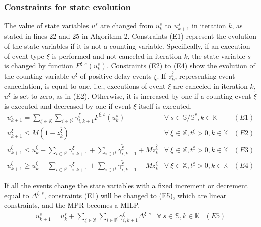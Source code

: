 \documentclass[]{interact}
\theoremstyle{plain}%
\theoremstyle{definition}
\theoremstyle{remark}
\begin{document}
\subsubsection{Constraints for state evolution}\label{sec:const_E}
The value of state variables $u^{s}$ are changed from $u^{s}_{k}$ to $u^{s}_{k+1}$ in iteration $k$, as stated in lines 22 and 25 in Algorithm 2. Constraints (E1) represent the evolution of the state variables if it is not a counting variable. Specifically, if an execution of event type $\xi$ is performed and not canceled in iteration $k$, the state variable $s$ is changed by function $F^{\xi,s}(u^{s}_{k})$. Constraints (E2) to (E4) show the evolution of the counting variable $u^{\xi}$ of positive-delay events ${\xi}$. If $z^{\bar{\xi}}_{k}$, representing event cancellation, is equal to one, i.e., executions of event ${\xi}$ are canceled in iteration $k$, $u^{\xi}$ is set to zero, as in (E2). Otherwise, it is increased by one if a counting event ${\tilde{\xi}}$ is executed and decreased by one if event ${\xi}$ itself is executed.
\begin{eqnarray}
u^{s}_{k+1} =  \sum_{\xi\in \mathbb{X}} \sum_{i\in \mathbb{I}^{\xi}} \gamma^{\xi}_{i,k+1} F^{\xi,s}(u^s_{k})& \forall\ s\in \mathbb{S}/\mathbb{S}^c,k\in \mathbb{K}&(E1)\nonumber\\
u^{\xi}_{k+1}\le M(1-z^{\bar{\xi}}_{k}) & \forall\ \xi\in\mathbb{X},t^{\xi}>0,k\in \mathbb{K}&(E2)\nonumber\\
u^{\xi}_{k+1}\le u^{\xi}_{k} - \sum_{i\in \mathbb{I}^{\xi}} \gamma^{\xi}_{i,k+1} + \sum_{i\in \mathbb{I}^{\xi}} \gamma^{\tilde{\xi}}_{i,k+1} + Mz^{\bar{\xi}}_{k}& \forall\ \xi\in\mathbb{X},t^{\xi}>0, k\in \mathbb{K}&(E3)\nonumber\\
u^{\xi}_{k+1}\ge u^{\xi}_{k} - \sum_{i\in \mathbb{I}^{\xi}} \gamma^{\xi}_{i,k+1} + \sum_{i\in \mathbb{I}^{\xi}} \gamma^{\tilde{\xi}}_{i,k+1}- Mz^{\bar{\xi}}_{k}& \forall\ \xi\in\mathbb{X},t^{\xi}>0,k\in \mathbb{K}&(E4)\nonumber
\end{eqnarray}

If all the events change the state variables with a fixed increment or decrement equal to $\Delta^{\xi,s}$, constraints (E1) will be changed to (E5), which are linear constraints, and the MPR becomes a MILP. 
\begin{eqnarray}
 u^{s}_{k+1} = u^s_{k} + \sum_{\xi\in \mathbb{X}} \sum_{i\in \mathbb{I}^{\xi}} \gamma^{\xi}_{i,k+1} \Delta^{\xi,s}& \forall\ s\in \mathbb{S},k\in \mathbb{K}&(E5)\nonumber
\end{eqnarray}
 
\end{document}
